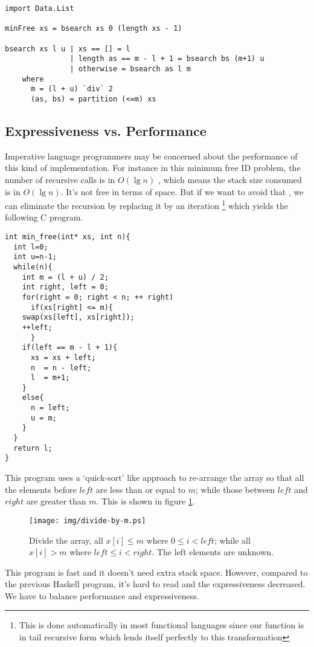 \documentclass[UTF8]{article}
\begin{document}
\lstset{language=Haskell}
\begin{lstlisting}
import Data.List

minFree xs = bsearch xs 0 (length xs - 1)

bsearch xs l u | xs == [] = l
               | length as == m - l + 1 = bsearch bs (m+1) u
               | otherwise = bsearch as l m
    where
      m = (l + u) `div` 2
      (as, bs) = partition (<=m) xs
\end{lstlisting}

\subsection{Expressiveness vs. Performance}
Imperative language programmers may be concerned about the performance
of this kind of implementation. For instance in this minimum
free ID problem, the number of recursive calls is in $O(\lg n)$
, which means the stack size consumed is in $O(\lg n)$.
It's not free in terms of space. But if we want to avoid that
, we can eliminate the recursion by replacing it by an iteration
\footnote{This is done automatically in most functional languages
since our function is in tail recursive form which lends itself
perfectly to this transformation} which yields the following C program.

\lstset{language=C}
\begin{lstlisting}
int min_free(int* xs, int n){
  int l=0;
  int u=n-1;
  while(n){
    int m = (l + u) / 2;
    int right, left = 0;
    for(right = 0; right < n; ++ right)
      if(xs[right] <= m){
	swap(xs[left], xs[right]);
	++left;
      }
    if(left == m - l + 1){
      xs = xs + left;
      n  = n - left;
      l  = m+1;
    }
    else{
      n = left;
      u = m;
    }
  }
  return l;
}
\end{lstlisting}

This program uses a `quick-sort' like approach to re-arrange the
array so that all the elements before $left$ are less than or equal
to $m$; while those between $left$ and $right$ are greater
than $m$. This is shown in figure \ref{fig:divide}.

\begin{figure}[htbp]
  \centering
  \texttt{[image: img/divide-by-m.ps]}
  \caption{Divide the array, all $x[i] \leq m$ where $0 \leq i < left$; while all $x[i] > m$ where $left \leq i < right$. The left elements are unknown.} \label{fig:divide}
\end{figure}

This program is fast and it doesn't need extra stack space. However,
compared to the previous Haskell program, it's hard to read and the
expressiveness decreased. We have to balance performance
and expressiveness.
\end{document}

